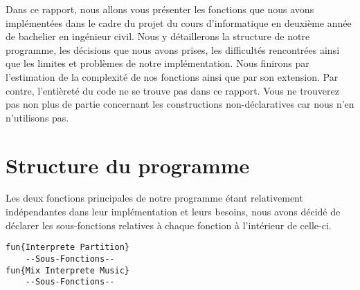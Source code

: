 \documentclass[a4paper,12pt]{report}
\begin{document}


\vspace*{5cm}
Dans ce rapport, nous allons vous présenter les fonctions que nous avons implémentées dans le cadre du projet du cours d'informatique en deuxième année de bachelier en ingénieur civil. Nous y détaillerons la structure de notre programme, les décisions que nous avons prises, les difficultés rencontrées ainsi que les limites et problèmes de notre implémentation. Nous finirons par l'estimation de la complexité de nos fonctions ainsi que par son extension. Par contre, l'entièreté du code ne se trouve pas dans ce rapport. Vous ne trouverez pas non plus de partie concernant les constructions non-déclaratives car nous n'en n'utilisons pas.

\section*{Structure du programme}
Les deux fonctions principales de notre programme étant relativement indépendantes dans leur implémentation et leurs besoins, nous avons décidé de déclarer les sous-fonctions relatives à chaque fonction à l'intérieur de celle-ci.
\begin{lstlisting}[frame=single] 
fun{Interprete Partition}
	--Sous-Fonctions--
fun{Mix Interprete Music}
	--Sous-Fonctions--
\end{lstlisting}
\newpage
\end{document}
